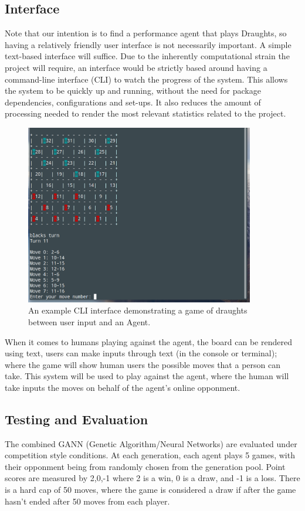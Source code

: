 \documentclass[12pt,a4paper]{article}
\begin{document}
\subsection*{Interface}

Note that our intention is to find a performance agent that plays Draughts, so having a relatively friendly user interface is not necessarily important. A simple text-based interface will suffice. Due to the inherently computational strain the project will require, an interface would be strictly based around having a command-line interface (CLI) to watch the progress of the system. This allows the system to be quickly up and running, without the need for package dependencies, configurations and set-ups. It also reduces the amount of processing needed to render the most relevant statistics related to the project.


\begin{figure}[ht!]
    \centering
    \includegraphics[width=100mm]{cli_humanvsagent.png}
    \caption{An example CLI interface demonstrating a game of draughts between user input and an Agent. \label{overflow2}}
\end{figure}

When it comes to humans playing against the agent, the board can be rendered using text, users can make inputs through text (in the console or terminal); where the game will show human users the possible moves that a person can take. This system will be used to play against the agent, where the human will take inputs the moves on behalf of the agent's online opponment. 

\subsection*{Testing and Evaluation}
The combined GANN (Genetic Algorithm/Neural Networks) are evaluated under competition style conditions. At each generation, each agent plays 5 games, with their opponment being from randomly chosen from the generation pool. Point scores are measured by {2,0,-1} where 2 is a win, 0 is a draw, and -1 is a loss. There is a hard cap of 50 moves, where the game is considered a draw if after the game hasn't ended after 50 moves from each player.
\end{document}
